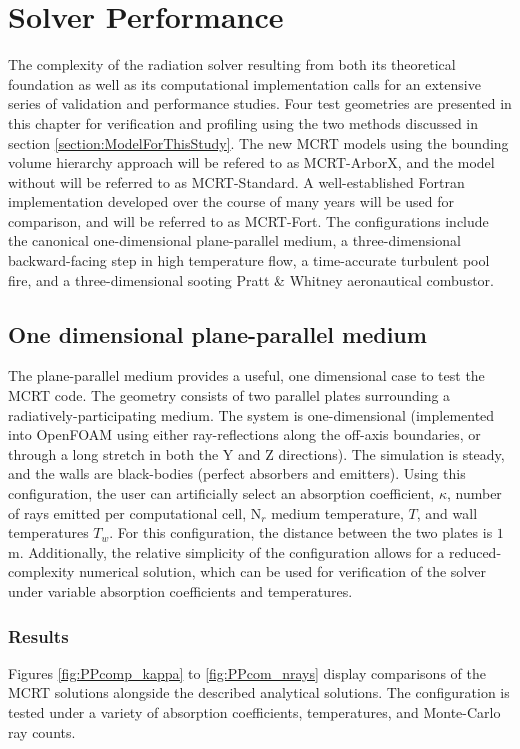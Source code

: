 \addchapheadtotoc
\chapter{Solver Performance}\label{chapter:Example}
The complexity of the radiation solver resulting from both its theoretical foundation as well as its computational implementation calls for an extensive series of validation and performance studies.
Four test geometries are presented in this chapter for verification and profiling using the two methods discussed in section \ref{section:ModelForThisStudy}. The new MCRT models using the bounding volume hierarchy approach will be refered to as MCRT-ArborX, and the model without will be referred to as MCRT-Standard. 
A well-established Fortran implementation developed over the course of many years will be used for comparison, and will be referred to as MCRT-Fort.
The configurations include the canonical one-dimensional plane-parallel medium, a three-dimensional backward-facing step in high temperature flow, a time-accurate turbulent pool fire, and a three-dimensional sooting Pratt \& Whitney aeronautical combustor. 



\section{One dimensional plane-parallel medium}
The plane-parallel medium provides a useful, one dimensional case to test the MCRT code. The geometry consists of two parallel plates surrounding a radiatively-participating medium. 
The system is one-dimensional (implemented into OpenFOAM using either ray-reflections along the off-axis boundaries, or through a long stretch in both the Y and Z directions). The simulation is steady, and the walls are black-bodies (perfect absorbers and emitters).
Using this configuration, the user can artificially select an absorption coefficient, $\kappa{}$, number of rays emitted per computational cell, N$_r$ medium temperature, $T$, and wall temperatures $T_w$. For this configuration, the distance between the two plates is $1$m.
Additionally, the relative simplicity of the configuration allows for a reduced-complexity numerical solution, which can be used for verification of the solver under variable absorption coefficients and temperatures.

\subsection{Results}
Figures \ref{fig:PPcomp_kappa} to \ref{fig:PPcom_nrays} display comparisons of the MCRT solutions alongside the described analytical solutions. The configuration is tested under a variety of absorption coefficients, temperatures, and Monte-Carlo ray counts.


